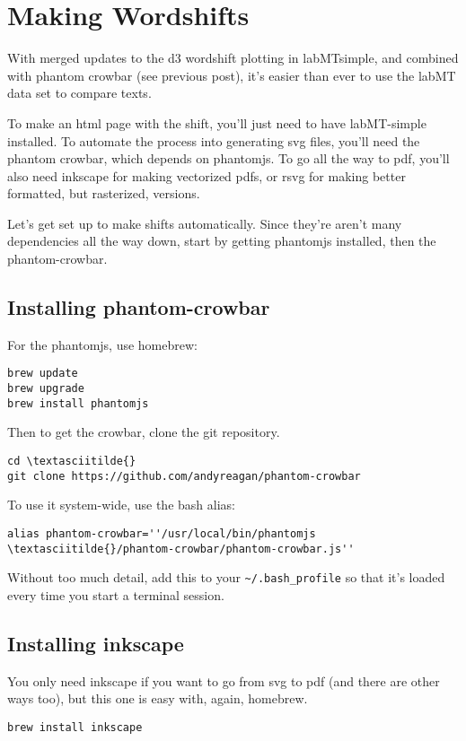\section{Making Wordshifts}
\label{wordshifts::doc}\label{wordshifts:making-wordshifts}
With merged updates to the d3 wordshift plotting in labMTsimple, and combined with phantom crowbar (see previous post), it's easier than ever to use the labMT data set to compare texts.

To make an html page with the shift, you'll just need to have labMT-simple installed.
To automate the process into generating svg files, you'll need the phantom crowbar, which depends on phantomjs.
To go all the way to pdf, you'll also need inkscape for making vectorized pdfs, or rsvg for making better formatted, but rasterized, versions.

Let's get set up to make shifts automatically.
Since they're aren't many dependencies all the way down, start by getting phantomjs installed, then the phantom-crowbar.


\subsection{Installing phantom-crowbar}
\label{wordshifts:installing-phantom-crowbar}
For the phantomjs, use homebrew:
\begin{lstlisting}
brew update
brew upgrade
brew install phantomjs
\end{lstlisting}

Then to get the crowbar, clone the git repository.
\begin{lstlisting}
cd \textasciitilde{}
git clone https://github.com/andyreagan/phantom-crowbar
\end{lstlisting}

To use it system-wide, use the bash alias:
\begin{lstlisting}
alias phantom-crowbar=''/usr/local/bin/phantomjs \textasciitilde{}/phantom-crowbar/phantom-crowbar.js''
\end{lstlisting}

Without too much detail, add this to your \lstinline{~/.bash_profile} so that it's loaded every time you start a terminal session.


\subsection{Installing inkscape}
\label{wordshifts:installing-inkscape}
You only need inkscape if you want to go from svg to pdf (and there are other ways too), but this one is easy with, again, homebrew.
\begin{lstlisting}
brew install inkscape
\end{lstlisting}


